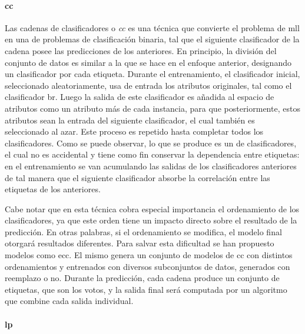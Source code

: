 \paragraph{\acrfull{cc}}

Las cadenas de clasificadores o \textit{\acrlong{cc}}
\cite{read_classifier_2011} es una técnica que convierte el problema de
\acrshort{mll} en una  de problemas de clasificación binaria,
tal que el siguiente clasificador de la cadena posee las predicciones de los
anteriores. En principio, la división del conjunto de datos es similar a la que
se hace en el enfoque anterior, designando un clasificador por cada etiqueta.
Durante el entrenamiento, el clasificador inicial, seleccionado aleatoriamente,
usa de entrada los atributos originales, tal como el clasificador \acrshort{br}.
Luego la salida de este clasificador es añadida al espacio de atributos como un
atributo más de cada instancia, para que posteriormente, estos atributos sean la
entrada del siguiente clasificador, el cual también es seleccionado al azar.
Este proceso es repetido hasta completar todos los clasificadores.  Como se
puede observar, lo que se produce es un  de
clasificadores, el cual no es accidental y tiene como fin conservar la
dependencia entre etiquetas: en el entrenamiento se van acumulando las salidas
de los clasificadores anteriores de tal manera que el siguiente clasificador
absorbe la correlación entre las etiquetas de los anteriores.

Cabe notar que en esta técnica cobra especial importancia el ordenamiento de los
clasificadores, ya que este orden tiene un impacto directo sobre el resultado de
la predicción. En otras palabras, si el ordenamiento se modifica, el modelo
final otorgará resultados diferentes. Para salvar esta dificultad se han
propuesto modelos como \acrfull{ecc}. El mismo genera un conjunto de modelos de
\acrshort{cc} con distintos ordenamientos y entrenados con diversos subconjuntos
de datos, generados con reemplazo o no. Durante la predicción, cada cadena
produce un conjunto de etiquetas, que son los votos, y la salida final será
computada por un algoritmo que combine cada salida individual.

\paragraph{\acrfull{lp}}

